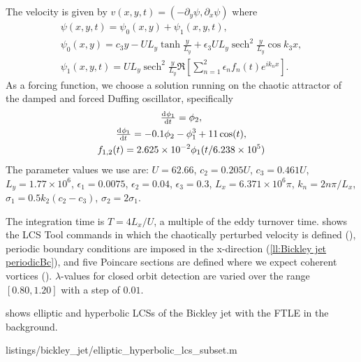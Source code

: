 \documentclass{elsarticle}
\DeclareMathOperator{\sech}{sech}
\begin{document}
The velocity is given by $v(x,y,t) = (-\partial_y \psi, \partial_x \psi)$ where
\begin{gather*}
\psi(x,y,t) = \psi_0(x,y) + \psi_1(x,y,t),\\
\psi_0(x,y) = c_3 y - U L_y \tanh\frac{y}{L_y} + \epsilon_3 U L_y \sech^2\frac{y}{L_y} \cos k_3 x,\\
\psi_1(x,y,t) = U L_y \sech^2\frac{y}{L_y} \Re\left[\sum_{n=1}^2 \epsilon_n f_n(t) e^{i k_n x}\right].
\end{gather*}
As a forcing function, we choose a solution running on the chaotic attractor of the damped and forced Duffing oscillator, specifically
\begin{gather*}
\od{\phi_1}{t} = \phi_2,\\
\od{\phi_1}{t} = -0.1 \phi_2 - \phi_1^3 + 11 \cos(t),\\
f_{1,2}(t) = 2.625 \times 10^{-2} \phi_1(t/6.238 \times 10^5)
\end{gather*}
The parameter values we use are: $U = 62.66$, $c_2 = 0.205 U$, $c_3 = 0.461 U$, $L_y = 1.77 \times 10^6$, $\epsilon_1 = 0.0075$, $\epsilon_2 = 0.04$, $\epsilon_3 = 0.3$, $L_x = 6.371 \times 10^6 \pi$, $k_n = 2 n \pi/L_x$, $\sigma_1 = 0.5 k_2 (c_2 - c_3)$, $\sigma_2 = 2 \sigma_1$.

The integration time is $T = 4L_x/U$, a multiple of the eddy turnover time.  shows the LCS Tool commands in which the chaotically perturbed velocity is defined (), periodic boundary conditions are imposed in the x-direction (\cref{ll:Bickley jet periodicBc}), and five Poincare sections are defined where we expect coherent vortices ().
$\lambda$-values for closed orbit detection are varied over the range $[0.80,1.20]$ with a step of $0.01$.

 shows elliptic and hyperbolic LCSs of the Bickley jet with the FTLE in the background.


        {listings/bickley_jet/elliptic_hyperbolic_lcs_subset.m}
\end{document}
